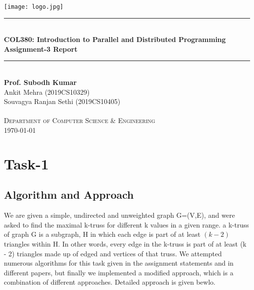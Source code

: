 \documentclass[12pt,a4paper]{article}
\newcommand{\HRule}{\rule{\linewidth}{0.5mm}}
\begin{document}
\begin{titlepage}
    \begin{center}
        \texttt{[image: logo.jpg]}~\\[2cm]
        \HRule \\[0.4cm]
        { \LARGE 
          \textbf{COL380: Introduction to Parallel and Distributed Programming}\\[0.4cm]
          \textbf{Assignment-3 Report}\\[0.4cm]
        }
        \HRule \\[1.5cm]
        { \large
          \textbf{Prof. Subodh Kumar} \\[0.1cm]
        }
        \vfill
        { \large
          Ankit Mehra (2019CS10329)\\[0.1cm]
          Souvagya Ranjan Sethi (2019CS10405)\\[0.1cm]
        }\\[0.4cm]
        \textsc{\large Department of Computer Science \& Engineering}\\[0.6cm]
        {\large \today}
    \end{center}
\end{titlepage}


\newpage
\section{Task-1}
\subsection{Algorithm and Approach}
We are given a simple, undirected and unweighted graph G=(V,E), and were asked to find the maximal k-truss for different k values in a given range. a k-truss of graph G is a subgraph, H in which each edge is part of at least $(k - 2)$ triangles within H.
In other words, every edge in the k-truss is part of at least (k - 2) triangles made up of edged and vertices of that truss.
We attempted numerous algorithms for this task given in the assignment statements and in different papers, but finally we implemented a modified approach, which is a combination of different approaches. Detailed approach is given bewlo. 
\vspace{-4mm}
\end{document}
